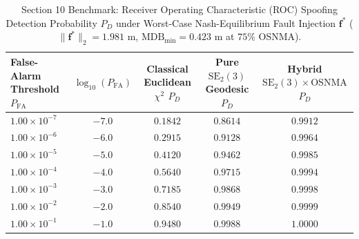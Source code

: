 \documentclass[11pt,a4paper,reqno]{article}
\theoremstyle{plain}
\theoremstyle{definition}
\theoremstyle{remark}
\numberwithin{equation}{section}
\begin{document}
\begin{table}[H]
\centering
\scriptsize
\caption{Section 10 Benchmark: Receiver Operating Characteristic (ROC) Spoofing Detection Probability $P_D$ under Worst-Case Nash-Equilibrium Fault Injection $\mathbf{f}^*$ ($\|\mathbf{f}^*\|_2 = 1.981\text{ m}$, $\mathrm{MDB}_{\min} = 0.423\text{ m}$ at $75\%$ OSNMA).}
\label{tab:roc_spoofing_curve}
\begin{tabularx}{\textwidth}{>{\raggedright\arraybackslash}X c c c c}
\toprule
\textbf{False-Alarm Threshold $P_{\mathrm{FA}}$} & $\log_{10}(P_{\mathrm{FA}})$ & \textbf{Classical Euclidean $\chi^2$ $P_D$} & \textbf{Pure $\mathrm{SE}_2(3)$ Geodesic $P_D$} & \textbf{Hybrid $\mathrm{SE}_2(3) \times \mathrm{OSNMA}$ $P_D$} \\
\midrule
$1.00 \times 10^{-7}$ & $-7.0$ & $0.1842$ & $0.8614$ & $\bm{0.9912}$ \\
$1.00 \times 10^{-6}$ & $-6.0$ & $0.2915$ & $0.9128$ & $\bm{0.9964}$ \\
$1.00 \times 10^{-5}$ & $-5.0$ & $0.4120$ & $0.9462$ & $\bm{0.9985}$ \\
$1.00 \times 10^{-4}$ & $-4.0$ & $0.5640$ & $0.9715$ & $\bm{0.9994}$ \\
$1.00 \times 10^{-3}$ & $-3.0$ & $0.7185$ & $0.9868$ & $\bm{0.9998}$ \\
$1.00 \times 10^{-2}$ & $-2.0$ & $0.8540$ & $0.9949$ & $\bm{0.9999}$ \\
$1.00 \times 10^{-1}$ & $-1.0$ & $0.9480$ & $0.9988$ & $\bm{1.0000}$ \\
\bottomrule
\end{tabularx}
\end{table}
\end{document}
